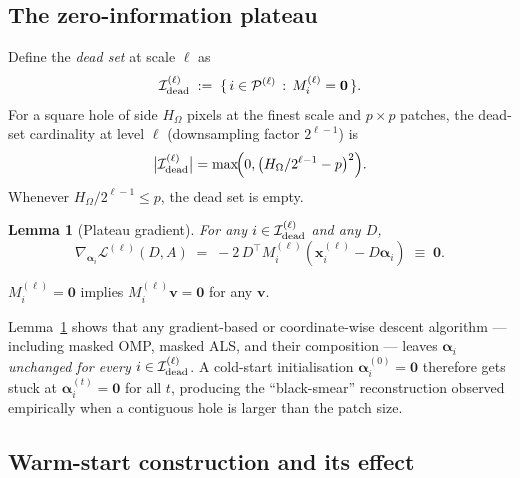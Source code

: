 \documentclass[journal,onecolumn,11pt]{IEEEtran}
\newtheorem{lemma}[theorem]{Lemma}
\theoremstyle{definition}
\newcommand{\Loss}{\mathcal{L}}
\newcommand{\xvec}{\bm{x}}
\newcommand{\alphavec}{\bm{\alpha}}
\begin{document}
\subsection{The zero-information plateau}

Define the \emph{dead set} at scale $\ell$ as
\begin{equation}
\mathcal{I}_{\rm dead}^{(\ell)}
\;:=\;
\{\,i\in\mathcal{P}^{(\ell)}\,:\, M_i^{(\ell)}=\bm{0}\,\}.
\end{equation}
For a square hole of side $H_\Omega$ pixels at the finest scale and
$p\times p$ patches, the dead-set cardinality at level $\ell$
(downsampling factor $2^{\ell-1}$) is
\begin{equation}
\bigl|\mathcal{I}_{\rm dead}^{(\ell)}\bigr|
=\max\!\Bigl(0,\bigl(H_\Omega/2^{\ell-1}-p\bigr)^2\Bigr).
\label{eq:dead-count}
\end{equation}
Whenever $H_\Omega/2^{\ell-1}\le p$, the dead set is empty.

\begin{lemma}[Plateau gradient]
\label{lem:plateau}
For any $i\in\mathcal{I}_{\rm dead}^{(\ell)}$ and any $D$,
\begin{equation}
\nabla_{\alphavec_i}\Loss^{(\ell)}(D,A)
\;=\;
-2\,D^\top M_i^{(\ell)}(\xvec_i^{(\ell)}-D\alphavec_i)
\;\equiv\;
\bm{0}.
\label{eq:plateau}
\end{equation}
\end{lemma}
\begin{IEEEproof}
$M_i^{(\ell)}=\bm{0}$ implies $M_i^{(\ell)}\bm{v}=\bm{0}$ for any
$\bm{v}$.
\end{IEEEproof}

Lemma~\ref{lem:plateau} shows that any gradient-based or coordinate-wise
descent algorithm — including masked OMP, masked ALS, and their composition
— leaves $\alphavec_i$ \emph{unchanged for every $i\in\mathcal{I}_{\rm dead}^{(\ell)}$}.
A cold-start initialisation $\alphavec_i^{(0)}=\bm{0}$ therefore gets stuck
at $\alphavec_i^{(t)}=\bm{0}$ for all $t$, producing the ``black-smear''
reconstruction observed empirically when a contiguous hole is larger than
the patch size.

\subsection{Warm-start construction and its effect}
\end{document}
